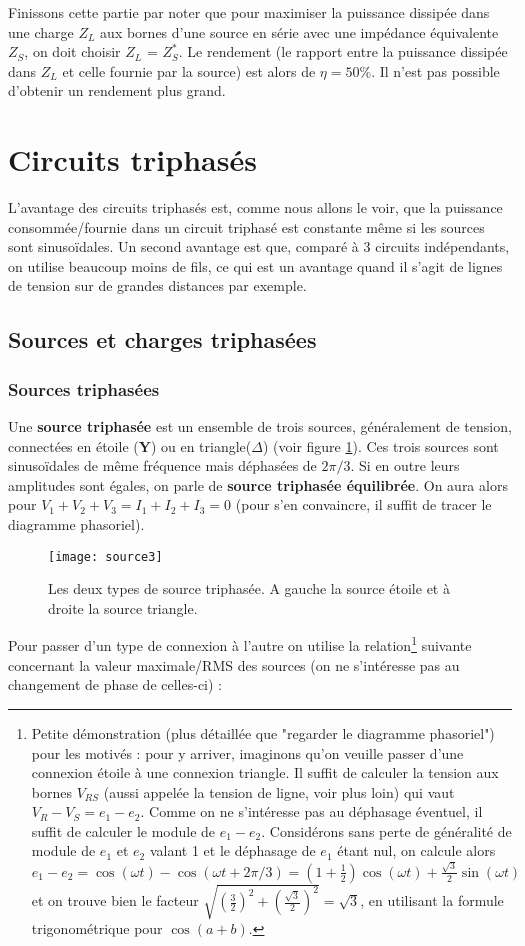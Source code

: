 Finissons cette partie par noter que pour maximiser la puissance dissipée dans une charge $Z_L$ aux bornes d'une source en série avec une impédance équivalente $Z_S$, on doit choisir $Z_L$ = $Z_S^*$. Le rendement (le rapport entre la puissance dissipée dans $Z_L$ et celle fournie par la source) est alors de $\eta = 50\%$. Il n'est pas possible d'obtenir un rendement plus grand.

\section{Circuits triphasés}
L'avantage des circuits triphasés est, comme nous allons le voir, que la puissance consommée/fournie dans un circuit triphasé est constante même si les sources sont sinusoïdales. Un second avantage est que, comparé à 3 circuits indépendants, on utilise beaucoup moins de fils, ce qui est un avantage quand il s'agit de lignes de tension sur de grandes distances par exemple.
\subsection{Sources et charges triphasées}
\subsubsection*{Sources triphasées}
Une \textbf{source triphasée} est un ensemble de trois sources, généralement de tension, connectées en étoile (\textbf{Y}) ou en triangle($\Delta$) (voir figure \ref{sourceTri}). Ces trois sources sont sinusoïdales de même fréquence mais déphasées de $2 \pi / 3$. Si en outre leurs amplitudes sont égales, on parle de \textbf{source triphasée équilibrée}. On aura alors pour $V_1 + V_2 + V_3 = I_1 + I_2 + I_3 = 0$ (pour s'en convaincre, il suffit de tracer le diagramme phasoriel).

\begin{figure}[h]
	\centering
    \texttt{[image: source3]}
    \caption{Les deux types de source triphasée. A gauche la source étoile et à droite la source triangle.}
    \label{sourceTri}
\end{figure}

Pour passer d'un type de connexion à l'autre on utilise la relation\footnote{Petite démonstration (plus détaillée que "regarder le diagramme phasoriel") pour les motivés : pour y arriver, imaginons qu'on veuille passer d'une connexion étoile à une connexion triangle. Il suffit de calculer la tension aux bornes $V_{RS}$ (aussi appelée la tension de ligne, voir plus loin) qui vaut $V_R - V_S = e_1 - e_2$. Comme on ne s'intéresse pas au déphasage éventuel, il suffit de calculer le module de $e_1 - e_2 $. Considérons sans perte de généralité de module de $e_1$ et $e_2$ valant 1 et le déphasage de $e_1$ étant nul, on calcule alors $e_1 - e_2 = \cos(\omega t) - \cos (\omega t + 2 \pi /3) = (1+\frac{1}{2}) \cos(\omega t) + \frac{\sqrt{3}}{2} \sin(\omega t)$ et on trouve bien le facteur $\sqrt{(\frac{3}{2})^2 + (\frac{\sqrt{3}}{2})^2} = \sqrt{3}$, en utilisant la formule trigonométrique pour $\cos(a+b)$.} suivante concernant la valeur maximale/RMS des sources (on ne s'intéresse pas au changement de phase de celles-ci) :

